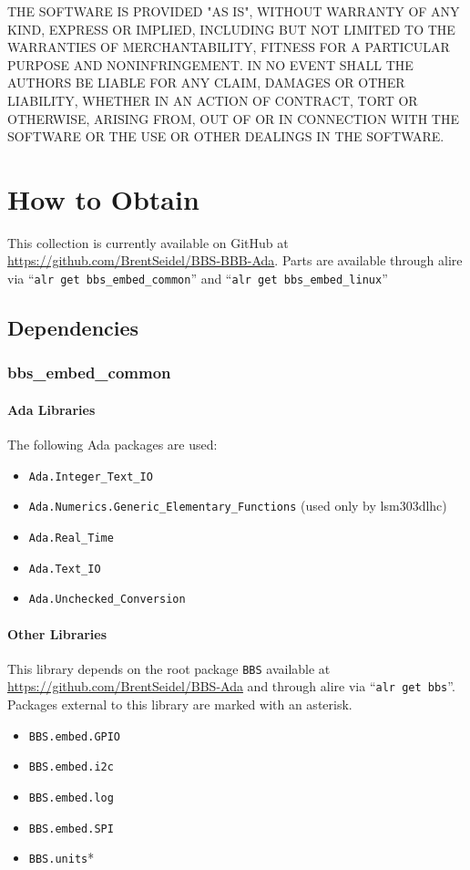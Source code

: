 \documentclass[10pt, openany]{book}
\newcommand{\package}[1]{\texttt{#1}}
\newcommand{\keyword}[1]{\texttt{#1}}
\begin{document}
THE SOFTWARE IS PROVIDED "AS IS", WITHOUT WARRANTY OF ANY KIND, EXPRESS OR IMPLIED, INCLUDING BUT NOT LIMITED TO THE WARRANTIES OF MERCHANTABILITY, FITNESS FOR A PARTICULAR PURPOSE AND NONINFRINGEMENT. IN NO EVENT SHALL THE AUTHORS BE LIABLE FOR ANY CLAIM, DAMAGES OR OTHER LIABILITY, WHETHER IN AN ACTION OF CONTRACT, TORT OR OTHERWISE, ARISING FROM, OUT OF OR IN CONNECTION WITH THE SOFTWARE OR THE USE OR OTHER DEALINGS IN THE SOFTWARE.

\chapter{How to Obtain}

This collection is currently available on GitHub at \url{https://github.com/BrentSeidel/BBS-BBB-Ada}.  Parts are available through alire via ``\keyword{alr get bbs\_embed\_common}'' and ``\keyword{alr get bbs\_embed\_linux}''

\section{Dependencies}
\subsection{bbs\_embed\_common}
\subsubsection{Ada Libraries}
The following Ada packages are used:
\begin{itemize}
  \item \package{Ada.Integer\_Text\_IO}
  \item \package{Ada.Numerics.Generic\_Elementary\_Functions} (used only by lsm303dlhc)
  \item \package{Ada.Real\_Time}
  \item \package{Ada.Text\_IO}
  \item \package{Ada.Unchecked\_Conversion}
\end{itemize}
\subsubsection{Other Libraries}
This library depends on the root package \package{BBS} available at \url{https://github.com/BrentSeidel/BBS-Ada} and through alire via ``\keyword{alr get bbs}''.  Packages external to this library are marked with an asterisk.
\begin{itemize}
  \item \package{BBS.embed.GPIO}
  \item \package{BBS.embed.i2c}
  \item \package{BBS.embed.log}
  \item \package{BBS.embed.SPI}
  \item \package{BBS.units}*
\end{itemize}
\end{document}
